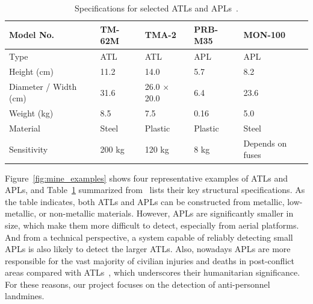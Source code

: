 \begin{table}[h]
    \centering
    \small
    \renewcommand{\arraystretch}{1.3}
    \caption{Specifications for selected ATLs and APLs~\cite{paik2002image}.}
    \label{tab:mine_specs}
    \begin{tabular}{l p{2.8cm} p{2.8cm} p{2.8cm} p{2.8cm}}
        \toprule
        \textbf{Model No.} & \textbf{TM-62M} & \textbf{TMA-2} & \textbf{PRB-M35} & \textbf{MON-100} \\
        \midrule
        Type & \gls{ATL} & \gls{ATL} & \gls{APL} & \gls{APL} \\
        Height (cm) & 11.2 & 14.0 & 5.7 & 8.2 \\
        Diameter / Width (cm) & 31.6 & 26.0 × 20.0 & 6.4 & 23.6 \\
        Weight (kg) & 8.5 & 7.5 & 0.16 & 5.0 \\
        Material & Steel & Plastic & Plastic & Steel \\
        Sensitivity & 200 kg & 120 kg & 8 kg & Depends on fuses \\
        \bottomrule
    \end{tabular}
\end{table}

Figure~\ref{fig:mine_examples} shows four representative examples of \gls{ATL}s and \gls{APL}s, and Table~\ref{tab:mine_specs} summarized from~\cite{paik2002image} lists their key structural specifications. As the table indicates, both \gls{ATL}s and \gls{APL}s can be constructed from metallic, low-metallic, or non-metallic materials. However, \gls{APL}s are significantly smaller in size, which make them more difficult to detect, especially from aerial platforms. And from a technical perspective, a system capable of reliably detecting small \gls{APL}s is also likely to detect the larger \gls{ATL}s. Also, nowadays \gls{APL}s are more responsible for the vast majority of civilian injuries and deaths in post-conflict areas compared with \gls{ATL}s~\cite{unmas2021handbook}, which underscores their humanitarian significance. For these reasons, our project focuses on the detection of anti-personnel landmines.

